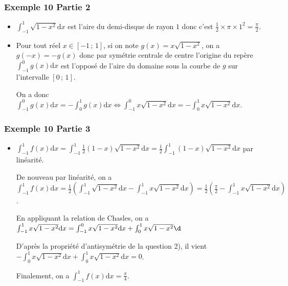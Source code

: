 \documentclass[11pt, hyperref={urlcolor=red,%
            linkcolor=blue, %
            colorlinks=true}]{beamer}
\newcommand{\Interff}[2]{\left[#1\, ;\, #2\right]}
\newcommand{\dx}{\ensuremath{\text{d}x}}		%
\begin{document}
\begin{frame}
\frametitle{Exemple  10 Partie 2}

\begin{itemize}
	\item  $\displaystyle\int_{-1}^{1}\sqrt{1-x^2}\dx$  est l'aire du demi-disque de rayon $1$ donc c'est $\frac{1}{2}\times \pi \times 1^{2}=\frac{\pi}{2}$.
	\item Pour tout réel $x \in \Interff{-1}{1}$, si on note $g(x)= x\sqrt{1-x^2}$, on a$g(-x)=-g(x)$ donc par symétrie centrale de centre l'origine du repère  $\int_{-1}^{0}g(x)\dx$ est l'opposé de l'aire du domaine sous la courbe de $g$  sur l'intervalle $\Interff{0}{1}$.

On a donc $\int_{-1}^{0}g(x)\dx = -\int_{0}^{1}g(x)\dx \Leftrightarrow  \displaystyle\int_{-1}^{0}x\sqrt{1-x^2}\dx=-\displaystyle\int_{0}^{1}x\sqrt{1-x^2}\dx $.


\end{itemize}


\end{frame}



\begin{frame}
\frametitle{Exemple  10 Partie 3}


\begin{itemize}
	
\item $\displaystyle\int_{-1}^{1}f(x)\dx = \displaystyle\int_{-1}^{1}\frac{1}{2}(1-x)\sqrt{1-x^2} \dx =\frac{1}{2}\displaystyle\int_{-1}^{1}(1-x)\sqrt{1-x^2} \dx$ par linéarité.

De nouveau par linéarité, on a $\displaystyle\int_{-1}^{1}f(x)\dx =\frac{1}{2}\left(\int_{-1}^{1}\sqrt{1-x^2} \dx - \int_{-1}^{1}x\sqrt{1-x^2} \dx\right) = \frac{1}{2}\left(\frac{\pi}{2}-  \int_{-1}^{1}x\sqrt{1-x^2}\dx \right) $.

En appliquant la relation de Chasles, on a  $ \int_{-1}^{1}x\sqrt{1-x^2}\dx = \int_{-1}^{0}x\sqrt{1-x^2}\dx + \int_{0}^{1}x\sqrt{1-x^2}\d$

D'après la propriété d'antisymétrie de la question 2), il vient $-\int_{0}^{1}x\sqrt{1-x^2}\dx +  \int_{0}^{1}x\sqrt{1-x^2}\dx=0$.

Finalement, on a  $\boxed{\displaystyle\int_{-1}^{1}f(x)\dx = \frac{\pi}{4}}$.

\end{itemize}


\end{frame}
\end{document}
